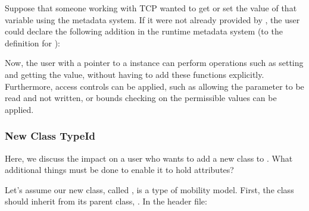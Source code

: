 \documentclass[letterpaper,10pt,english]{sphinxmanual}
\renewcommand{\sphinxcode}[1]{\texttt{\small{#1}}}
\begin{document}
Suppose that someone working with TCP wanted to get or set the value of that
variable using the metadata system. If it were not already provided by ,
the user could declare the following addition in the runtime metadata system (to
the \sphinxcode{} definition for \sphinxcode{}):

\begin{sphinxVerbatim}[commandchars=\\\{\}]
 
                
                
                
\end{sphinxVerbatim}

Now, the user with a pointer to a \sphinxcode{} instance
can perform operations such as
setting and getting the value, without having to add these functions explicitly.
Furthermore, access controls can be applied, such as allowing the parameter to
be read and not written, or bounds checking on the permissible values can be
applied.


\subsubsection{New Class TypeId}
\label{\detokenize{attributes:new-class-typeid}}
Here, we discuss the impact on a user who wants to add a new class to .
What additional things must be done to enable it to hold attributes?

Let’s assume our new class, called \sphinxcode{},
is a type of mobility model.  First, the class should inherit from
its parent class, \sphinxcode{}.
In the \sphinxcode{} header file:

\begin{sphinxVerbatim}[commandchars=\\\{\}]
  

    
\end{sphinxVerbatim}
\end{document}
